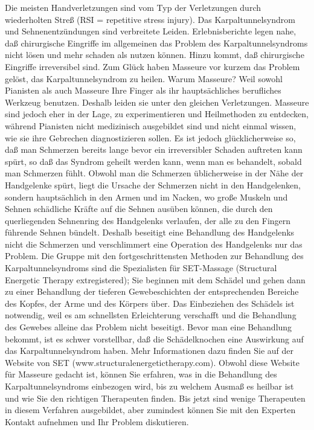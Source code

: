 Die meisten Handverletzungen sind vom Typ der Verletzungen durch wiederholten Streß (RSI = repetitive stress injury).
Das Karpaltunnelsyndrom und Sehnenentzündungen sind verbreitete Leiden.
Erlebnisberichte legen nahe, daß chirurgische Eingriffe im allgemeinen das Problem des Karpaltunnelsyndroms nicht lösen und mehr schaden als nutzen können.
Hinzu kommt, daß chirurgische Eingriffe irreversibel sind.
Zum Glück haben Masseure vor kurzem das Problem gelöst, das Karpaltunnelsyndrom zu heilen.
Warum Masseure?
Weil sowohl Pianisten als auch Masseure Ihre Finger als ihr hauptsächliches berufliches Werkzeug benutzen.
Deshalb leiden sie unter den gleichen Verletzungen.
Masseure sind jedoch eher in der Lage, zu experimentieren und Heilmethoden zu entdecken, während Pianisten nicht medizinisch ausgebildet sind und nicht einmal wissen, wie sie ihre Gebrechen diagnostizieren sollen.
Es ist jedoch glücklicherweise so, daß man Schmerzen bereits lange bevor ein irreversibler Schaden auftreten kann spürt, so daß das Syndrom geheilt werden kann, wenn man es behandelt, sobald man Schmerzen fühlt.
Obwohl man die Schmerzen üblicherweise in der Nähe der Handgelenke spürt, liegt die Ursache der Schmerzen nicht in den Handgelenken, sondern hauptsächlich in den Armen und im Nacken, wo große Muskeln und Sehnen schädliche Kräfte auf die Sehnen ausüben können, die durch den querliegenden Sehnenring des Handgelenks verlaufen, der alle zu den Fingern führende Sehnen bündelt.
Deshalb beseitigt eine Behandlung des Handgelenks nicht die Schmerzen und verschlimmert eine Operation des Handgelenks nur das Problem.
Die Gruppe mit den fortgeschrittensten Methoden zur Behandlung des Karpaltunnelsyndroms sind die Spezialisten für SET-Massage (Structural Energetic Therapy	extregistered); Sie beginnen mit dem Schädel und gehen dann zu einer Behandlung der tieferen Gewebeschichten der entsprechenden Bereiche des Kopfes, der Arme und des Körpers über.
Das Einbeziehen des Schädels ist notwendig, weil es am schnellsten Erleichterung verschafft und die Behandlung des Gewebes alleine das Problem nicht beseitigt.
Bevor man eine Behandlung bekommt, ist es schwer vorstellbar, daß die Schädelknochen eine Auswirkung auf das Karpaltunnelsyndrom haben.
Mehr Informationen dazu finden Sie auf der Website von SET (www.structuralenergetictherapy.com).
Obwohl diese Website für Masseure gedacht ist, können Sie erfahren, was in die Behandlung des Karpaltunnelsyndroms einbezogen wird, bis zu welchem Ausmaß es heilbar ist und wie Sie den richtigen Therapeuten finden.
Bis jetzt sind wenige Therapeuten in diesem Verfahren ausgebildet, aber zumindest können Sie mit den Experten Kontakt aufnehmen und Ihr Problem diskutieren.
